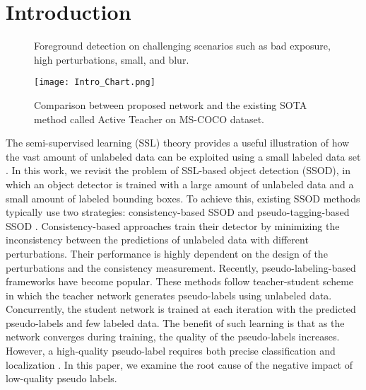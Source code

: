 \documentclass[10pt,twocolumn,letterpaper]{article}
\begin{document}
\section{Introduction}
\label{sec:intro}
\begin{figure}[t!]
    \centering
         \hspace{0em}
         \vspace{-1em}
         \hspace{0em}
        \vspace{-1em}
\caption{Foreground detection on challenging scenarios such as bad exposure, high perturbations, small, and blur.} \label{fig:res_page_1}
\end{figure}
\vspace{-0.5em}
\begin{figure}[t!]
    \centering
        \texttt{[image: Intro\_Chart.png]}\vspace{-0.5em}
\caption{Comparison between proposed network and the existing SOTA method called Active Teacher \cite{ActiveTeacher} on MS-COCO dataset.} \label{fig:intro_chart}
\end{figure}
The semi-supervised learning (SSL) theory provides a useful illustration of how the vast amount of unlabeled data can be exploited using a small labeled data set \cite{SSL2020survey}. In this work, we revisit the problem of SSL-based object detection (SSOD), in which an object detector is trained with a large amount of unlabeled data and a small amount of labeled bounding boxes. To achieve this, existing SSOD methods typically use two strategies: consistency-based SSOD \cite{tang2021proposal, jeong2019consistency} and pseudo-tagging-based SSOD \cite{xu2021end, ActiveTeacher, PoshingTeacher, DCST, MAGCP, LabelMatch}. Consistency-based approaches train their detector by minimizing the inconsistency between the predictions of unlabeled data with different perturbations. Their performance is highly dependent on the design of the perturbations and the consistency measurement.
Recently, pseudo-labeling-based frameworks \cite{xu2021end, ActiveTeacher, PoshingTeacher, DCST, MAGCP, LabelMatch} have become popular. These methods follow teacher-student scheme in which the teacher network generates pseudo-labels using unlabeled data. Concurrently, the student network is trained at each iteration with the predicted pseudo-labels and few labeled data. 
The benefit of such learning is that as the network converges during training, the quality of the pseudo-labels increases. However, a high-quality pseudo-label requires both precise classification and localization \cite{DCST}. In this paper, we examine the root cause of the negative impact of low-quality pseudo labels.
\end{document}
